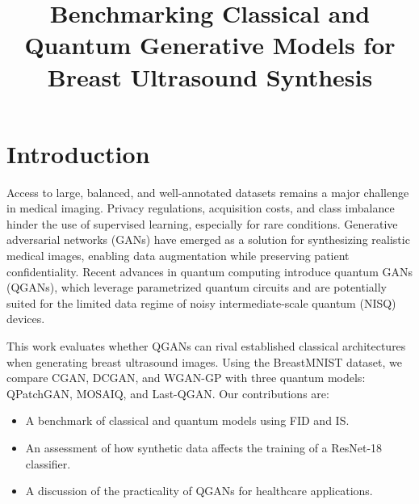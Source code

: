 \documentclass[pdflatex,sn-mathphys-num]{sn-jnl}
\theoremstyle{thmstyleone}
\theoremstyle{thmstyletwo}
\theoremstyle{thmstylethree}
\begin{document}
\title[Classical vs Quantum GANs for BreastMNIST]{Benchmarking Classical and Quantum Generative Models for Breast Ultrasound Synthesis}

\author*[1]{ }
\author[1]{ }
\author[1]{ }



\maketitle

\section{Introduction}\label{sec:introduction}
Access to large, balanced, and well-annotated datasets remains a major challenge in medical imaging. Privacy regulations, acquisition costs, and class imbalance hinder the use of supervised learning, especially for rare conditions. Generative adversarial networks (GANs) have emerged as a solution for synthesizing realistic medical images, enabling data augmentation while preserving patient confidentiality. Recent advances in quantum computing introduce quantum GANs (QGANs), which leverage parametrized quantum circuits and are potentially suited for the limited data regime of noisy intermediate-scale quantum (NISQ) devices.

This work evaluates whether QGANs can rival established classical architectures when generating breast ultrasound images. Using the BreastMNIST dataset, we compare CGAN, DCGAN, and WGAN-GP with three quantum models: QPatchGAN, MOSAIQ, and Last-QGAN. Our contributions are:
\begin{itemize}
    \item A benchmark of classical and quantum models using FID and IS.
    \item An assessment of how synthetic data affects the training of a ResNet-18 classifier.
    \item A discussion of the practicality of QGANs for healthcare applications.
\end{itemize}
\end{document}
